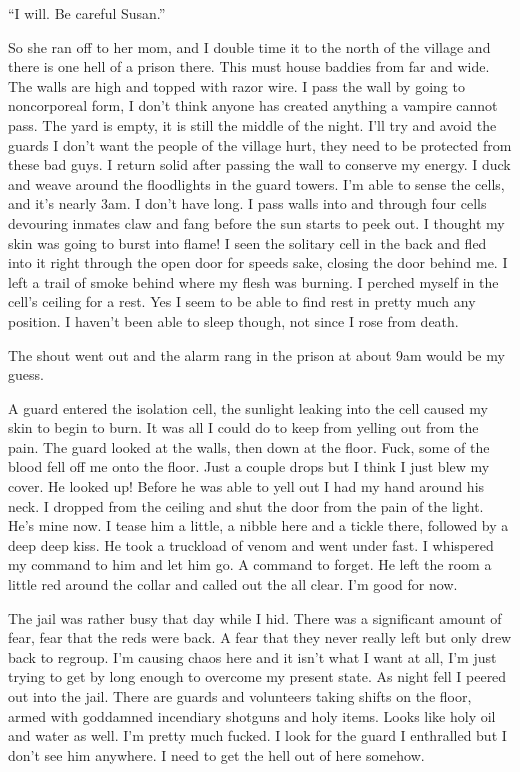 ``I will. Be careful Susan.''

So she ran off to her mom, and I double time it to the north of the village and there is one hell of a prison there. This must house baddies from far and wide. The walls are high and topped with razor wire. I pass the wall by going to noncorporeal form, I don't think anyone has created anything a vampire cannot pass. The yard is empty, it is still the middle of the night. I'll try and avoid the guards I don't want the people of the village hurt, they need to be protected from these bad guys. I return solid after passing the wall to conserve my energy. I duck and weave around the floodlights in the guard towers. I'm able to sense the cells, and it's nearly 3am. I don't have long. I pass walls into and through four cells devouring inmates claw and fang before the sun starts to peek out. I thought my skin was going to burst into flame! I seen the solitary cell in the back and fled into it right through the open door for speeds sake, closing the door behind me. I left a trail of smoke behind where my flesh was burning. I perched myself in the cell's ceiling for a rest. Yes I seem to be able to find rest in pretty much any position. I haven't been able to sleep though, not since I rose from death.

The shout went out and the alarm rang in the prison at about 9am would be my guess.

A guard entered the isolation cell, the sunlight leaking into the cell caused my skin to begin to burn. It was all I could do to keep from yelling out from the pain. The guard looked at the walls, then down at the floor. Fuck, some of the blood fell off me onto the floor. Just a couple drops but I think I just blew my cover. He looked up! Before he was able to yell out I had my hand around his neck. I dropped from the ceiling and shut the door from the pain of the light. He's mine now. I tease him a little, a nibble here and a tickle there, followed by a deep deep kiss. He took a truckload of venom and went under fast. I whispered my command to him and let him go. A command to forget. He left the room a little red around the collar and called out the all clear. I'm good for now.

The jail was rather busy that day while I hid. There was a significant amount of fear, fear that the reds were back. A fear that they never really left but only drew back to regroup. I'm causing chaos here and it isn't what I want at all, I'm just trying to get by long enough to overcome my present state. As night fell I peered out into the jail. There are guards and volunteers taking shifts on the floor, armed with goddamned incendiary shotguns and holy items. Looks like holy oil and water as well. I'm pretty much fucked. I look for the guard I enthralled but I don't see him anywhere. I need to get the hell out of here somehow.

